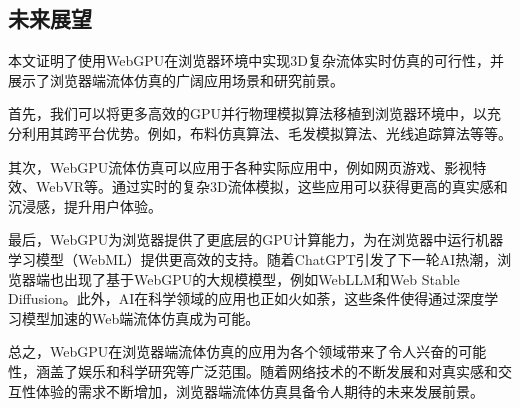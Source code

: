 \subsection{未来展望}
    本文证明了使用WebGPU在浏览器环境中实现3D复杂流体实时仿真的可行性，并展示了浏览器端流体仿真的广阔应用场景和研究前景。
    
    首先，我们可以将更多高效的GPU并行物理模拟算法移植到浏览器环境中，以充分利用其跨平台优势。例如，布料仿真算法、毛发模拟算法、光线追踪算法等等。
    
    其次，WebGPU流体仿真可以应用于各种实际应用中，例如网页游戏、影视特效、WebVR等。通过实时的复杂3D流体模拟，这些应用可以获得更高的真实感和沉浸感，提升用户体验。
    
    最后，WebGPU为浏览器提供了更底层的GPU计算能力，为在浏览器中运行机器学习模型（WebML）提供更高效的支持。随着ChatGPT引发了下一轮AI热潮，浏览器端也出现了基于WebGPU的大规模模型，例如WebLLM和Web Stable Diffusion。此外，AI在科学领域的应用也正如火如荼，这些条件使得通过深度学习模型加速的Web端流体仿真成为可能。
    
    总之，WebGPU在浏览器端流体仿真的应用为各个领域带来了令人兴奋的可能性，涵盖了娱乐和科学研究等广泛范围。随着网络技术的不断发展和对真实感和交互性体验的需求不断增加，浏览器端流体仿真具备令人期待的未来发展前景。